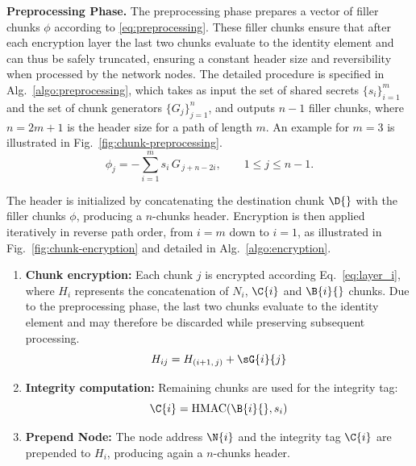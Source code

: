 \smallskip
\noindent\textbf{Preprocessing Phase.}
The preprocessing phase prepares a vector of filler chunks $\phi$ according to \eqref{eq:preprocessing}.
These filler chunks ensure that after each encryption layer the last two chunks evaluate to the identity element and can thus be safely truncated, ensuring a constant header size and reversibility when processed by the network nodes. 
The detailed procedure is specified in Alg.~\ref{algo:preprocessing}, which takes as input the set of shared secrets $\{s_i\}_{i=1}^{m}$ and the set of chunk generators $\{G_j\}_{j=1}^{n}$, and outputs $n-1$ filler chunks, where $n = 2m+1$ is the header size for a path of length $m$. 
An example for $m=3$ is illustrated in Fig.~\ref{fig:chunk-preprocessing}.
\begin{equation}
    \phi_j = - \sum_{i=1}^{m} s_i\, G_{\,j+n-2i}, \qquad 1 \le j \le n-1 .
\label{eq:preprocessing}
\end{equation}

The header is initialized by concatenating the destination chunk $\D{}$ with the filler chunks $\phi$, producing a $n$-chunks header.
Encryption is then applied iteratively in reverse path order, from $i=m$ down to $i=1$, 
as illustrated in Fig.~\ref{fig:chunk-encryption} and detailed in Alg.~\ref{algo:encryption}.
\begin{enumerate}
    \item \textbf{Chunk encryption:}
    Each chunk $j$ is encrypted according Eq.~\eqref{eq:layer_i}, where $H_i$ represents the concatenation of $N_i$, $\C{i}$ and $\B{i}{}$ chunks.
    Due to the preprocessing phase, the last two chunks evaluate to the identity element and may therefore be discarded while preserving subsequent processing.
    \begin{equation}
        H_{ij} = H_{(i+1,\,j)} + \sG{i}{j}
        \label{eq:layer_i}
    \end{equation}

    \item \textbf{Integrity computation:} Remaining chunks are used for the integrity tag: 
    \begin{equation}
        \C{i} =  \text{HMAC}(\B{i}{}, s_i)
        \label{eq:integrity}
    \end{equation}

    \item \textbf{Prepend Node:}
    The node address $\N{i}$ and the integrity tag $\C{i}$ are prepended to $H_i$, producing again a $n$-chunks header.
\end{enumerate}

